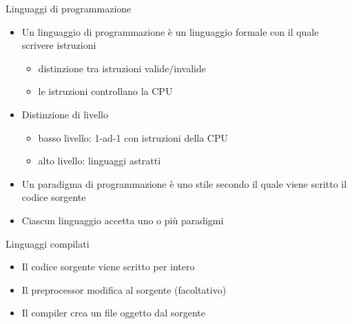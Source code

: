 \begin{frame}{Linguaggi di programmazione}
  \vfill
  \begin{itemize}
    \item Un \alert{linguaggio} di programmazione è un linguaggio \alert{formale}
    con il quale scrivere istruzioni
    \begin{itemize}
      \item distinzione tra istruzioni valide/invalide
      \item le istruzioni controllano la CPU
    \end{itemize}
    \vfill
    \item Distinzione di \alert{livello}
    \begin{itemize}
      \item basso livello: \alert{1-ad-1} con istruzioni della CPU
      \item alto livello: linguaggi \alert{astratti}
    \end{itemize}
    \vfill
    \item Un \alert{paradigma di programmazione} è uno stile secondo il quale
    viene scritto il codice sorgente
    \vfill
    \item Ciascun linguaggio accetta uno o più paradigmi
  \end{itemize}
  \vfill
\end{frame}

\begin{frame}{Linguaggi compilati}
  \vfill
  \begin{center}\end{center}
  \vfill
  \begin{itemize}
    \item Il codice sorgente viene scritto per intero \vfill
    \item Il \alert{preprocessor} modifica al sorgente (facoltativo) \vfill
    \item Il \alert{compiler} crea un file oggetto dal sorgente
  \end{itemize}
  \vfill
\end{frame}

